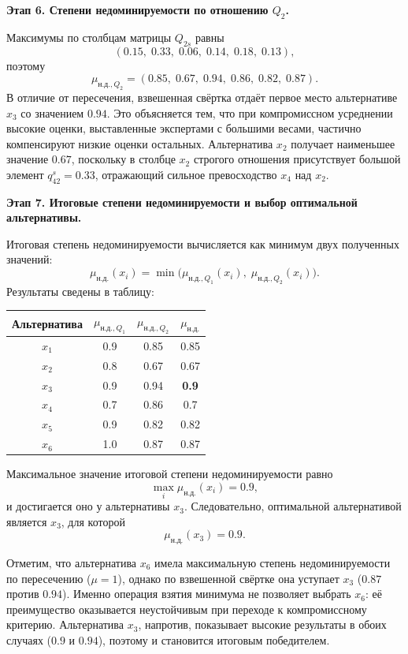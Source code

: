 
\textbf{Этап 6. Степени недоминируемости по отношению $Q_2$.}

Максимумы по столбцам матрицы $Q_{2s}$ равны
\[
(0.15,\; 0.33,\; 0.06,\; 0.14,\; 0.18,\; 0.13),
\]
поэтому
\[
\mu_{\text{н.д.},Q_2} = (0.85,\; 0.67,\; 0.94,\; 0.86,\; 0.82,\; 0.87).
\]
В отличие от пересечения, взвешенная свёртка отдаёт первое место альтернативе $x_3$ со значением $0.94$. Это объясняется тем, что при компромиссном усреднении высокие оценки, выставленные экспертами с большими весами, частично компенсируют низкие оценки остальных. Альтернатива $x_2$ получает наименьшее значение $0.67$, поскольку в столбце $x_2$ строгого отношения присутствует большой элемент $q^{s}_{42}=0.33$, отражающий сильное превосходство $x_4$ над $x_2$.


\textbf{Этап 7. Итоговые степени недоминируемости и выбор оптимальной альтернативы.}

Итоговая степень недоминируемости вычисляется как минимум двух полученных значений:
\[
\mu_{\text{н.д.}}(x_i) = \min\bigl(\mu_{\text{н.д.},Q_1}(x_i),\; \mu_{\text{н.д.},Q_2}(x_i)\bigr).
\]
Результаты сведены в таблицу:

\begin{center}
\begin{tabular}{|c|c|c|c|}
\hline
Альтернатива & $\mu_{\text{н.д.},Q_1}$ & $\mu_{\text{н.д.},Q_2}$ & $\mu_{\text{н.д.}}$ \\
\hline
$x_1$ & 0.9 & 0.85 & 0.85 \\
$x_2$ & 0.8 & 0.67 & 0.67 \\
$x_3$ & 0.9 & 0.94 & \textbf{0.9} \\
$x_4$ & 0.7 & 0.86 & 0.7 \\
$x_5$ & 0.9 & 0.82 & 0.82 \\
$x_6$ & 1.0 & 0.87 & 0.87 \\
\hline
\end{tabular}
\end{center}

Максимальное значение итоговой степени недоминируемости равно
\[
\max_i \mu_{\text{н.д.}}(x_i) = 0.9,
\]
и достигается оно у альтернативы $x_3$. Следовательно, оптимальной альтернативой является $x_3$, для которой
\[
\mu_{\text{н.д.}}(x_3) = 0.9.
\]

Отметим, что альтернатива $x_6$ имела максимальную степень недоминируемости по пересечению ($\mu = 1$), однако по взвешенной свёртке она уступает $x_3$ ($0.87$ против $0.94$). Именно операция взятия минимума не позволяет выбрать $x_6$: её преимущество оказывается неустойчивым при переходе к компромиссному критерию. Альтернатива $x_3$, напротив, показывает высокие результаты в обоих случаях ($0.9$ и $0.94$), поэтому и становится итоговым победителем.

